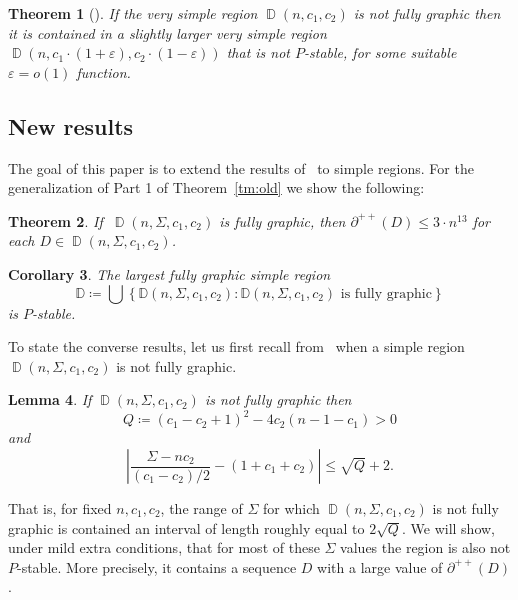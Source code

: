 \documentclass[11pt]{elsarticle}
\theoremstyle{plain}
\newtheorem{theorem}{Theorem}[section]
\newtheorem{lemma}[theorem]{Lemma}
\newtheorem{corollary}[theorem]{Corollary}
\theoremstyle{definition}
\def\mD{\mathbb{D}}
\newcommand{\ep}{\varepsilon}
\newcommand{\dd}[3]{\operatorname{\mathbb D}(#1,#2,#3)}
\newcommand{\dds}[4]{\operatorname{\mathbb D}(#1,#2,#3,#4)}
\newcommand{\pppp}[1]{\partial^{++}(#1)}
\begin{document}
\begin{theorem}[{\cite[Theorem 5.8]{fully}}]\label{tm:old2}
If the very simple region $\dd{n}{c_1}{c_2}$ is not fully graphic then it is contained in a slightly larger very simple region $\dd{n}{c_1\cdot (1+\ep)}{c_2\cdot(1-\ep)}$ that is not $P$-stable, for some suitable $\ep = o(1)$ function.
\end{theorem}


\subsection{New results}\label{sec:new_results}

The goal of this paper is to extend the results of~\cite{fully} to simple regions. For the generalization of Part 1 of Theorem~\ref{tm:old} we show the following:
\begin{theorem}\label{tm:main}
If $\ \dds{n}{\Sigma}{c_1}{c_2}$ is fully graphic, then $\pppp{D}\le 3\cdot n^{13}$ for each  $D\in \dds{n}{\Sigma}{c_1}{c_2}$.
\end{theorem}

\begin{corollary}
The largest fully graphic simple region
\begin{displaymath}
\mathbb D\coloneqq\bigcup\left\{\mD(n,\Sigma, c_1,c_2):
\mD(n,\Sigma, c_1,c_2) \text{ is fully graphic} \right\}
\end{displaymath}
is $P$-stable.
\end{corollary}

To state the converse results, let us first recall from~\cite{fully} when a simple region $\dds{n}{\Sigma}{c_1}{c_2}$ is not fully graphic.

\begin{lemma}\label{lem:fully}
If $\dds{n}{\Sigma}{c_1}{c_2}$ is not fully graphic then
\begin{equation}\label{eq:fully-iff}
Q \coloneqq (c_1 - c_2 + 1)^2 - 4c_2(n - 1 - c_1) > 0
\end{equation}
and
\begin{equation}\label{eq:fully-iff2}
\left| \frac{\Sigma - n c_2}{(c_1 - c_2)/2} - (1 + c_1 + c_2) \right| \leq \sqrt{Q}+2.
\end{equation}
\end{lemma}

That is, for fixed $n,c_1,c_2$, the range of $\Sigma$ for which $\dds{n}{\Sigma}{c_1}{c_2}$ is not fully graphic is contained an interval of length roughly equal to $2\sqrt{Q}$. We will show, under mild extra conditions, that for most of these $\Sigma$ values the region is also not $P$-stable. More precisely, it contains a sequence $D$ with a large value of $\pppp D$.
\end{document}
